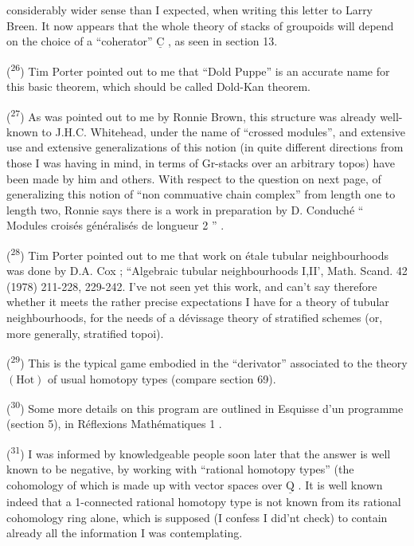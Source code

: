 considerably wider sense than I expected, when writing this letter to Larry Breen. It now appears that the whole theory of stacks of groupoids will depend on the choice of a ``coherator'' $\underline{\mathrm{C}}$ , as seen in section 13.

(\textsuperscript{26}) Tim Porter pointed out to me that ``Dold Puppe'' is an accurate name for this basic theorem, which should be called Dold-Kan theorem.

(\textsuperscript{27}) As was pointed out to me by Ronnie Brown, this structure was already well-known to J.H.C. Whitehead, under the name of ``crossed modules'', and extensive use and extensive generalizations of this notion (in quite different directions from those I was having in mind, in terms of Gr-stacks over an arbitrary topos) have been made by him and others. With respect to the question on next page, of generalizing this notion of ``non commuative chain complex'' from length one to length two, Ronnie says there is a work in preparation by D. Conduché `` Modules croisés généralisés de longueur 2 '' .

(\textsuperscript{28}) Tim Porter pointed out to me that work on étale tubular neighbourhoods was done by D.A. Cox ; ``Algebraic tubular neighbourhoods I,II', Math. Scand. 42 (1978) 211-228, 229-242. I've not seen yet this work, and can't say therefore whether it meets the rather precise expectations I have for a theory of tubular neighbourhoods, for the needs of a dévissage theory of stratified schemes (or, more generally, stratified topoi).

(\textsuperscript{29}) This is the typical game  embodied in the ``derivator'' associated to the theory $(\mathrm{Hot})$ of usual homotopy types (compare section 69).

(\textsuperscript{30}) Some more details on this program are outlined in Esquisse d'un programme (section 5), in Réflexions Mathématiques 1 .

(\textsuperscript{31}) I was informed by knowledgeable people soon later that the answer is well known to be negative, by working with ``rational homotopy types'' (the cohomology of which is made up with vector spaces over $\underline{\mathrm{Q}}$ . It is well known indeed that a 1-connected rational homotopy type is not known from its rational cohomology ring alone, which is supposed (I confess I did'nt check) to contain already all the information I was contemplating.

